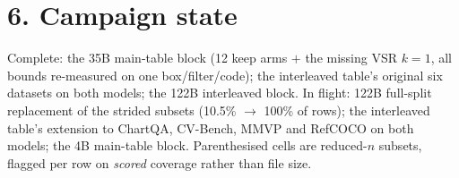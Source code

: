 \documentclass[10pt]{article}
\begin{document}
\section*{6. Campaign state}

Complete: the 35B main-table block (12 keep arms $+$ the missing VSR $k{=}1$, all bounds
re-measured on one box/filter/code); the interleaved table's original six datasets on both models;
the 122B interleaved block. In flight: 122B full-split replacement of the strided subsets
(10.5\% $\to$ 100\% of rows); the interleaved table's extension to ChartQA, CV-Bench, MMVP and
RefCOCO on both models; the 4B main-table block. Parenthesised cells are reduced-$n$ subsets,
flagged per row on \emph{scored} coverage rather than file size.
\end{document}
